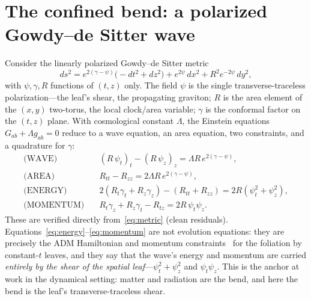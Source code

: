 \documentclass[11pt,a4paper]{article}
\theoremstyle{plain}
\theoremstyle{definition}
\theoremstyle{remark}
\begin{document}
\section{The confined bend: a polarized Gowdy--de Sitter wave}\label{sec:gowdy}

Consider the linearly polarized Gowdy--de Sitter metric
\begin{equation}
ds^2 = e^{2(\gamma-\psi)}\bigl(-dt^2+dz^2\bigr) + e^{2\psi}\,dx^2 + R^2 e^{-2\psi}\,dy^2,
\label{eq:metric}
\end{equation}
with $\psi,\gamma,R$ functions of $(t,z)$ only. The field $\psi$ is the single transverse-traceless polarization---the leaf's shear, the propagating graviton; $R$ is the area element of the $(x,y)$ two-torus, the local clock/area variable; $\gamma$ is the conformal factor on the $(t,z)$ plane. With cosmological constant $\Lambda$, the Einstein equations $G_{ab}+\Lambda g_{ab}=0$ reduce to a wave equation, an area equation, two constraints, and a quadrature for $\gamma$:
\begin{align}
\text{(WAVE)}\quad & (R\,\psi_t)_t-(R\,\psi_z)_z = \Lambda R\, e^{2(\gamma-\psi)}, \label{eq:wave}\\
\text{(AREA)}\quad & R_{tt}-R_{zz} = 2\Lambda R\, e^{2(\gamma-\psi)}, \label{eq:area}\\
\text{(ENERGY)}\quad & 2(R_t\gamma_t+R_z\gamma_z)-(R_{tt}+R_{zz}) = 2R(\psi_t^2+\psi_z^2), \label{eq:energy}\\
\text{(MOMENTUM)}\quad & R_t\gamma_z+R_z\gamma_t-R_{tz} = 2R\,\psi_t\psi_z. \label{eq:momentum}
\end{align}
These are verified directly from~\eqref{eq:metric} (clean residuals). Equations~\eqref{eq:energy}--\eqref{eq:momentum} are not evolution equations: they are precisely the ADM Hamiltonian and momentum constraints~\cite{ADM1962} for the foliation by constant-$t$ leaves, and they say that the wave's energy and momentum are carried \emph{entirely by the shear of the spatial leaf}---$\psi_t^2+\psi_z^2$ and $\psi_t\psi_z$. This is the anchor at work in the dynamical setting: matter and radiation are the bend, and here the bend is the leaf's transverse-traceless shear.
\end{document}
